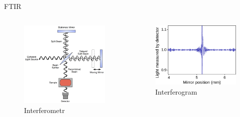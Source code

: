 \documentclass[polish, 12pt, aspectratio=169]{beamer}
\begin{document}
\begin{frame}{FTIR}
    \vspace{0.5em}
    \begin{columns}
        \begin{figure}
            \includegraphics[width=\linewidth]{img/interferometer.png}
            \caption*{Interferometr}
        \end{figure}
    \pause{}
        \begin{figure}
            \includegraphics[width=\linewidth]{img/ftir.eps}
            \caption*{Interferogram}
        \end{figure}
    \end{columns}
\end{frame}
\end{document}
